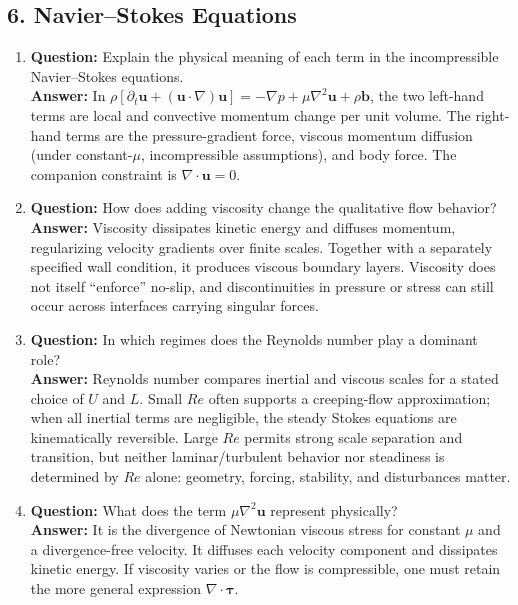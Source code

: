 \documentclass[12pt]{article}
\begin{document}
\subsection*{6. Navier--Stokes Equations}
\begin{enumerate}
\item \textbf{Question:} Explain the physical meaning of each term in the incompressible Navier--Stokes equations.\\
\textbf{Answer:} In $\rho[\partial_t\mathbf{u}+(\mathbf{u}\cdot\nabla)\mathbf{u}]=-\nabla p+\mu\nabla^2\mathbf{u}+\rho\mathbf{b}$, the two left-hand terms are local and convective momentum change per unit volume. The right-hand terms are the pressure-gradient force, viscous momentum diffusion (under constant-$\mu$, incompressible assumptions), and body force. The companion constraint is $\nabla\cdot\mathbf{u}=0$.

\item \textbf{Question:} How does adding viscosity change the qualitative flow behavior?\\
\textbf{Answer:} Viscosity dissipates kinetic energy and diffuses momentum, regularizing velocity gradients over finite scales. Together with a separately specified wall condition, it produces viscous boundary layers. Viscosity does not itself ``enforce'' no-slip, and discontinuities in pressure or stress can still occur across interfaces carrying singular forces.

\item \textbf{Question:} In which regimes does the Reynolds number play a dominant role?\\
\textbf{Answer:} Reynolds number compares inertial and viscous scales for a stated choice of $U$ and $L$. Small $Re$ often supports a creeping-flow approximation; when all inertial terms are negligible, the steady Stokes equations are kinematically reversible. Large $Re$ permits strong scale separation and transition, but neither laminar/turbulent behavior nor steadiness is determined by $Re$ alone: geometry, forcing, stability, and disturbances matter.

\item \textbf{Question:} What does the term $\mu \nabla^2 \mathbf{u}$ represent physically?\\
\textbf{Answer:} It is the divergence of Newtonian viscous stress for constant $\mu$ and a divergence-free velocity. It diffuses each velocity component and dissipates kinetic energy. If viscosity varies or the flow is compressible, one must retain the more general expression $\nabla\cdot\boldsymbol{\tau}$.
\end{enumerate}
\end{document}
